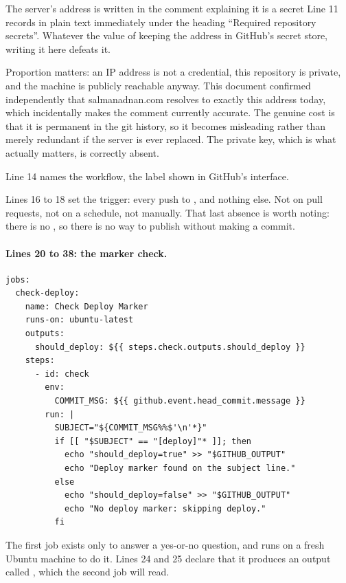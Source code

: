 \begin{honest}{The server's address is written in the comment explaining it is a
secret}
Line 11 records  in plain text immediately under the
heading ``Required repository secrets''. Whatever the value of keeping the address
in GitHub's secret store, writing it here defeats it.

Proportion matters: an IP address is not a credential, this repository is private,
and the machine is publicly reachable anyway. This document confirmed independently
that salmanadnan.com resolves to exactly this address today, which incidentally
makes the comment currently accurate. The genuine cost is that it is permanent in
the git history, so it becomes misleading rather than merely redundant if the server
is ever replaced. The private key, which is what actually matters, is correctly
absent.
\end{honest}

Line 14 names the workflow, the label shown in GitHub's interface.

Lines 16 to 18 set the trigger: every push to , and nothing else. Not on
pull requests, not on a schedule, not manually. That last absence is worth noting:
there is no , so there is no way to publish without making
a commit.

\paragraph{Lines 20 to 38: the marker check.}

\begin{lstlisting}[firstnumber=20,caption={\file{deploy.yml.disabled}, lines 20--38}]
jobs:
  check-deploy:
    name: Check Deploy Marker
    runs-on: ubuntu-latest
    outputs:
      should_deploy: ${{ steps.check.outputs.should_deploy }}
    steps:
      - id: check
        env:
          COMMIT_MSG: ${{ github.event.head_commit.message }}
        run: |
          SUBJECT="${COMMIT_MSG%%$'\n'*}"
          if [[ "$SUBJECT" == "[deploy]"* ]]; then
            echo "should_deploy=true" >> "$GITHUB_OUTPUT"
            echo "Deploy marker found on the subject line."
          else
            echo "should_deploy=false" >> "$GITHUB_OUTPUT"
            echo "No deploy marker: skipping deploy."
          fi
\end{lstlisting}

The first job exists only to answer a yes-or-no question, and runs on a fresh Ubuntu
machine to do it. Lines 24 and 25 declare that it produces an output called
, which the second job will read.

